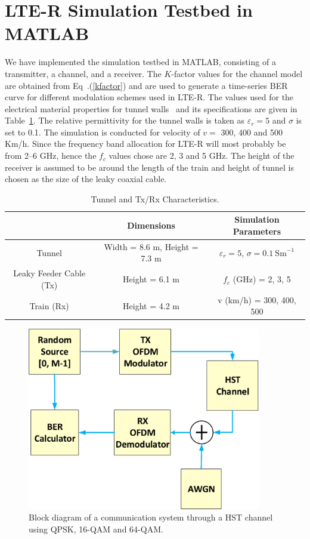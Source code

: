 \section{LTE-R Simulation Testbed in MATLAB}
We have implemented the simulation testbed in MATLAB, consisting of a transmitter, a channel, and a receiver. The $K$-factor values for the channel model are obtained from Eq~.(\ref{kfactor}) and are used to generate a time-series BER curve for different modulation schemes used in LTE-R. The values used for the electrical material properties for tunnel walls~\cite{lter17} and its specifications are given in Table~\ref{tablelter}. The relative permittivity for the tunnel walls is taken as $\varepsilon_r = 5$ and $\sigma$ is set to 0.1. The simulation is conducted for velocity of $v = $ 300, 400 and 500 Km/h. Since the frequency band allocation for LTE-R will most probably be from 2--6 GHz, hence the $f_c$ values chose are 2, 3 and 5 GHz. The height of the receiver is assumed to be around the length of the train and height of tunnel is chosen as the size of the leaky coaxial cable.

\begin{table}[t!]
\centering
\caption{Tunnel and Tx/Rx Characteristics.}
\begin{tabular}{c  c  c }
\toprule
   & Dimensions & Simulation Parameters\\ \midrule
Tunnel & Width = 8.6 m, Height = 7.3 m & $\varepsilon_r = 5$, $\sigma = 0.1~\textrm{Sm}^{-1}$\\
Leaky Feeder Cable (Tx) & Height = 6.1 m & $f_c$ (GHz) = 2, 3, 5\\
Train (Rx) & Height = 4.2 m &  v (km/h) = 300, 400, 500\\
\bottomrule
\end{tabular}
\label{tablelter}
\end{table}

\begin{figure}[!ht]
\centering
\includegraphics[width=\textwidth,height=8cm,keepaspectratio]{images/Gill/lte_figs/finalblock.eps} 
\caption{Block diagram of a communication system through a HST channel using QPSK, 16-QAM and 64-QAM.}
\label{finalblock}
\end{figure}

